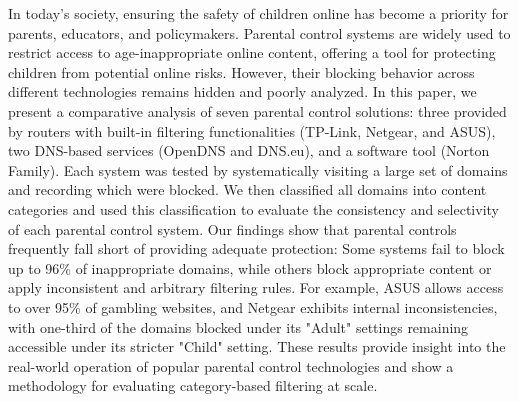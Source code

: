 In today's society, ensuring the safety of children online has become a priority for parents, educators, and policymakers. Parental control systems are widely used to restrict access to age-inappropriate online content, offering a tool for protecting children from potential online risks.
However, their blocking behavior across different technologies remains hidden and poorly analyzed.
In this paper, we present a comparative analysis of seven parental control solutions: three provided by routers with built-in filtering functionalities (TP-Link, Netgear, and ASUS), two DNS-based services (OpenDNS and DNS.eu), and a software tool (Norton Family).
Each system was tested by systematically visiting a large set of domains and recording which were blocked.
We then classified all domains into content categories and used this classification to evaluate the consistency and selectivity of each parental control system.
Our findings show that parental controls frequently fall short of providing adequate protection: Some systems fail to block up to 96\% of inappropriate domains, while others block appropriate content or apply inconsistent and arbitrary filtering rules.
For example, ASUS allows access to over 95\% of gambling websites, and Netgear exhibits internal inconsistencies, with one-third of the domains blocked under its "Adult" settings remaining accessible under its stricter "Child" setting.
These results provide insight into the real-world operation of popular parental control technologies and show a methodology for evaluating category-based filtering at scale.